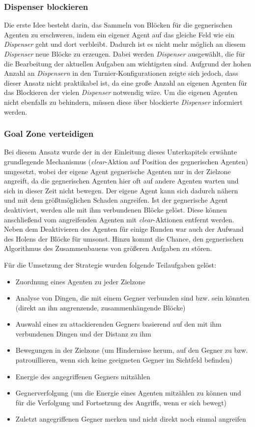 \documentclass[runningheads]{llncs}
\begin{document}
	\subsubsection{Dispenser blockieren}
	Die erste Idee besteht darin, das Sammeln von Blöcken für die gegnerischen Agenten zu erschweren, indem ein eigener Agent auf das gleiche Feld wie ein \textit{Dispenser} geht und dort verbleibt. Dadurch ist es nicht mehr möglich an diesem \textit{Dispenser} neue Blöcke zu erzeugen. Dabei werden \textit{Dispenser} ausgewählt, die für die Bearbeitung der aktuellen Aufgaben am wichtigsten sind. Aufgrund der hohen Anzahl an \textit{Dispensern} in den Turnier-Konfigurationen zeigte sich jedoch, dass dieser Ansatz nicht praktikabel ist, da eine große Anzahl an eigenen Agenten für das Blockieren der vielen \textit{Dispenser} notwendig wäre. Um die eigenen Agenten nicht ebenfalls zu behindern, müssen diese über blockierte \textit{Dispenser} informiert werden.
	
	\subsubsection{Goal Zone verteidigen}
	Bei diesem Ansatz wurde der in der Einleitung dieses Unterkapitels erwähnte grundlegende Mechanismus (\textit{clear}-Aktion auf Position des gegnerischen Agenten) umgesetzt, wobei der eigene Agent gegnerische Agenten nur in der Zielzone angreift, da die gegnerischen Agenten hier oft auf andere Agenten warten und sich in dieser Zeit nicht bewegen. Der eigene Agent kann sich dadurch nähern und mit dem größtmöglichen Schaden angreifen. Ist der gegnerische Agent deaktiviert, werden alle mit ihm verbundenen Blöcke gelöst. Diese können anschließend vom angreifenden Agenten mit \textit{clear}-Aktionen entfernt werden. Neben dem Deaktivieren des Agenten für einige Runden war auch der Aufwand des Holens der Blöcke für umsonst. Hinzu kommt die Chance, den gegnerischen Algorithmus des Zusammenbauens von größeren Aufgaben zu stören.
	
	Für die Umsetzung der Strategie wurden folgende Teilaufgaben gelöst:
	\begin{itemize}
		\item{Zuordnung eines Agenten zu jeder Zielzone}
		\item{Analyse von Dingen, die mit einem Gegner verbunden sind bzw. sein könnten (direkt an ihn angrenzende, zusammenhängende Blöcke)}
		\item{Auswahl eines zu attackierenden Gegners basierend auf den mit ihm verbundenen Dingen und der Distanz zu ihm}
		\item{Bewegungen in der Zielzone (um Hindernisse herum, auf den Gegner zu bzw. patrouillieren, wenn sich keine geeigneten Gegner im Sichtfeld befinden)}
		\item{Energie des angegriffenen Gegners mitzählen}
		\item{Gegnerverfolgung (um die Energie eines Agenten mitzählen zu können und für die Verfolgung und Fortsetzung des Angriffs, wenn er sich bewegt)}
		\item{Zuletzt angegriffenen Gegner merken und nicht direkt noch einmal angreifen}
	\end{itemize}
	
\end{document}
